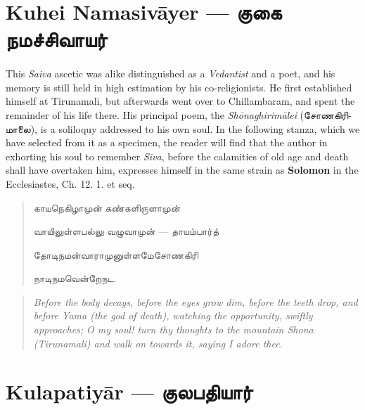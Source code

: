 \documentclass{article}
\newcommand{\TamilText}[1]{\texttamil{#1}}
\newcommand{\TamilBold}[1]{\texttamil{\textbf{#1}}}
\newcommand{\tam}[1]{\TamilText{#1}}
\newcommand{\tambold}[1]{\TamilBold{#1}}
\begin{document}
\section{Kuhei Namasiv\={a}yer --- \tambold{குகை நமச்சிவாயர்}}
\paragraph{}
This \emph{Saiva} ascetic was alike distinguished as a \emph{Vedantist} and a poet, and his memory is still held in high estimation by his co-religionists. He first established himself at Tirunamali, but afterwards went over to Chillambaram, and spent the remainder of his life there. His principal poem, the \emph{Sh\={o}naghirim\={a}lei} (\tam{சோணகிரிமாலை}), is a soliloquy addressed to his own soul. In the following stanza, which we have selected from it as a specimen, the reader will find that the author in exhorting his soul to remember \emph{Siva}, before the calamities of old age and death shall have overtaken him, expresses himself in the same strain as \textbf{Solomon} in the Ecclesiastes, Ch. 12. 1. et seq.
\begin{quotation}\small
\tam{காயநெகிழாமுன்‌ கண்களிருளாமுன்‌}

\tam{வாயிலுள்ளபல்லு வழுவாமுன்‌} --- \tam{தாயம்பார்த்‌}

\tam{தோடிநமன்வாராமுனுள்ளமேசோணகிரி}

\tam{நாடிநமவென்றேநட}.
\end{quotation}
\begin{quotation}\small
\emph{Before the body decays, before the eyes grow dim, before the teeth drop, and before Yama (the god of death), watching the opportunity, swiftly approaches; O my soul! turn thy thoughts to the mountain Shona (Tirunamali) and walk on towards it, saying I adore thee.}
\end{quotation}
\section{Kulapatiy\={a}r --- \tambold{குலபதியார்}}
\end{document}
